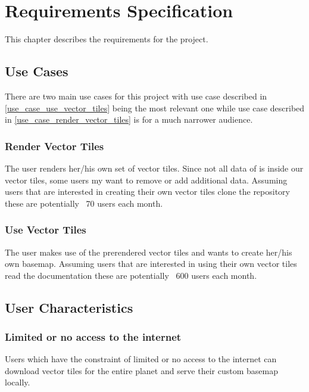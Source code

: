 \chapter{Requirements Specification}\label{requirements_specification}

This chapter describes the requirements for the project.

\section{Use Cases}\label{use_cases}

There are two main use cases for this project with use case described in \autoref{use_case_use_vector_tiles} being the most relevant one while use case described in \autoref{use_case_render_vector_tiles} is for a much narrower audience.

\subsection{Render Vector Tiles}\label{use_case_render_vector_tiles}

The user renders her/his own set of vector tiles. Since not all data of \osm{} is inside our vector tiles, some users my want to remove or add additional data. Assuming users that are interested in creating their own vector tiles clone the \osmvt{} repository these are potentially ~70 users each month.

\subsection{Use Vector Tiles}\label{use_case_use_vector_tiles}

The user makes use of the prerendered vector tiles and wants to create her/his own basemap. Assuming users that are interested in using their own vector tiles read the documentation these are potentially ~600 users each month.

\section{User Characteristics}\label{user_characteristics}

\subsection{Limited or no access to the internet}

Users which have the constraint of limited or no access to the internet can download vector tiles for the entire planet and serve their custom basemap locally.

